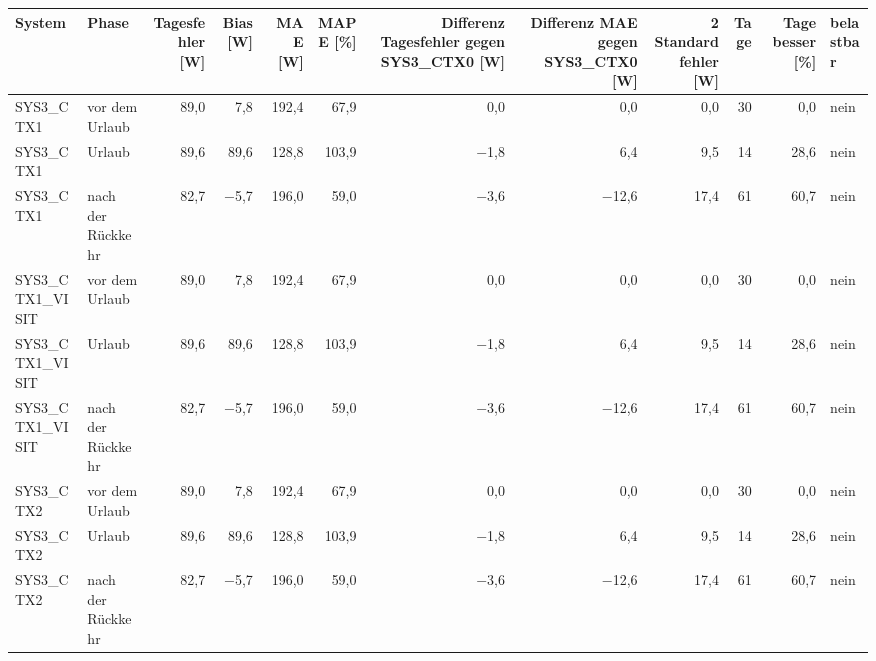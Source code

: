 \begin{tabular}{llrrrrrrrrrl}
\toprule
System & Phase & Tagesfehler [W] & Bias [W] & MAE [W] & MAPE [\%] & Differenz Tagesfehler gegen SYS3\_CTX0 [W] & Differenz MAE gegen SYS3\_CTX0 [W] & 2 Standardfehler [W] & Tage & Tage besser [\%] & belastbar \\
\midrule
SYS3\_CTX1 & vor dem Urlaub & 89,0 & 7,8 & 192,4 & 67,9 & 0,0 & 0,0 & 0,0 & 30 & 0,0 & nein \\
SYS3\_CTX1 & Urlaub & 89,6 & 89,6 & 128,8 & 103,9 & $-$1,8 & 6,4 & 9,5 & 14 & 28,6 & nein \\
SYS3\_CTX1 & nach der Rückkehr & 82,7 & $-$5,7 & 196,0 & 59,0 & $-$3,6 & $-$12,6 & 17,4 & 61 & 60,7 & nein \\
SYS3\_CTX1\_VISIT & vor dem Urlaub & 89,0 & 7,8 & 192,4 & 67,9 & 0,0 & 0,0 & 0,0 & 30 & 0,0 & nein \\
SYS3\_CTX1\_VISIT & Urlaub & 89,6 & 89,6 & 128,8 & 103,9 & $-$1,8 & 6,4 & 9,5 & 14 & 28,6 & nein \\
SYS3\_CTX1\_VISIT & nach der Rückkehr & 82,7 & $-$5,7 & 196,0 & 59,0 & $-$3,6 & $-$12,6 & 17,4 & 61 & 60,7 & nein \\
SYS3\_CTX2 & vor dem Urlaub & 89,0 & 7,8 & 192,4 & 67,9 & 0,0 & 0,0 & 0,0 & 30 & 0,0 & nein \\
SYS3\_CTX2 & Urlaub & 89,6 & 89,6 & 128,8 & 103,9 & $-$1,8 & 6,4 & 9,5 & 14 & 28,6 & nein \\
SYS3\_CTX2 & nach der Rückkehr & 82,7 & $-$5,7 & 196,0 & 59,0 & $-$3,6 & $-$12,6 & 17,4 & 61 & 60,7 & nein \\
\bottomrule
\end{tabular}
